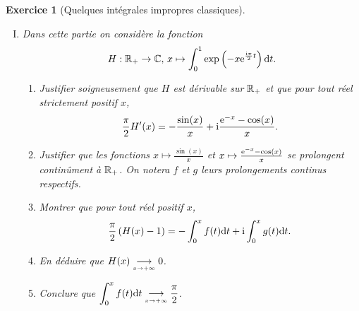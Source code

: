 \documentclass[a4paper, 10pt]{article}
\newcommand{\reponse}[1]{\textit{#1}}
\theoremstyle{exo}
\newtheorem{exo}{Exercice}
\begin{document}
\begin{exo}[Quelques intégrales impropres classiques]
\begin{enumerate}[I.]
\begin{enumerate}[1.]
\reponse{}
  \item\label{constante} En déduire que $\disp \R_+\to \R,\,x\mapsto G\left(x^2\right)+\left(\int_0^{x}\e^{-t^2}\d t\right)^2$ est constante.

\reponse{}
  \item Montrer que pour tout réel $x$ positif,
    $$0\leq G(x^2)\leq\frac{\pi}{4} \e^{-x^2}.$$

\reponse{}
  \item En déduire très soigneusement que
    $$\int_0^x\e^{-t^2}\d t\tend{x\to+\infty}\frac{\sqrt{\pi}}{2}.$$

\reponse{}
  \end{enumerate}
\item Dans cette partie on considère la fonction
  $$H:\mathbb{R}_+\to \mathbb{C},\,x\mapsto \int_0^1\exp\left(-x\mathrm{e}^{\frac{\mathrm{i}\pi}{2}t}\right)\mathrm{d} t.$$
  \begin{enumerate}[1.]
  \item\label{dérivée} Justifier soigneusement que $H$ est dérivable sur $\mathbb{R}_+$ et que pour tout réel strictement positif $x$,
    $$\frac{\pi}{2}H'(x)=-\frac{\sin(x)}{x}+\mathrm{i}\frac{\mathrm{e}^{-x}-\cos(x)}{x}.$$

\reponse{}
  \item Justifier que les fonctions $x\mapsto \frac{\sin(x)}{x}$ et $x\mapsto \frac{\mathrm{e}^{-x}-\cos(x)}{x}$ se prolongent continûment à $\mathbb{R}_+$. On notera $f$ et $g$ leurs prolongements continus respectifs.

\reponse{}
  \item\label{égalité} Montrer que pour tout réel positif $x$,
    $$\frac{\pi}{2}\left(H(x)-1\right)=-\int_0^xf(t)\mathrm{d} t +\mathrm{i}\int_0^xg(t)\mathrm{d} t.$$

\reponse{}
  \item En déduire que $H(x)\underset{\scriptscriptstyle{x\to+\infty}}{\longrightarrow}0$.

\reponse{}
  \item Conclure que $\displaystyle \int_0^xf(t)\mathrm{d} t\underset{\scriptscriptstyle{x\to +\infty}}{\longrightarrow}\frac{\pi}{2}$.

\reponse{}
  \end{enumerate}
\end{enumerate}
\end{exo}
\end{document}
